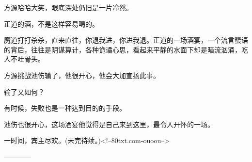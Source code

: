 \begin{this_body}
方源哈哈大笑，眼底深处仍旧是一片冷然。

正道的酒，不是这样容易喝的。

魔道打打杀杀，直来直往，你退我进，你进我退。正道的一场酒宴，一个流言蜚语的背后，往往是阴谋算计，各种诡谲心思，看起来平静的水面下却是暗流汹涌，吃人不吐骨头。

方源挑战池伤输了，他很开心，他会大加宣扬此事。

输了又如何？

有时候，失败也是一种达到目的的手段。

池伤也很开心，这场酒宴他觉得是自己来到这里，最令人开怀的一场。

一时间，宾主尽欢。(未完待续。)<!--80txt.com-ouoou-->

------------

\end{this_body}

